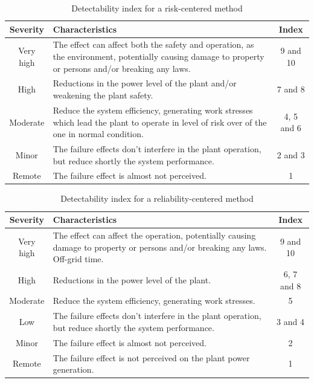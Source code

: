\begin{table}[!htb]
    \centering
        \begin{tabular}{ cp{10cm}c }
        \hline
        Severity & Characteristics & Index \\ \hline\hline
        Very high  & The effect can affect both the safety and operation, as the environment, potentially causing damage to property or persons and/or breaking any laws.  & 9 and 10 \\
        High       & Reductions in the power level of the plant and/or weakening the plant safety.  & 7 and 8 \\
        Moderate   & Reduce the system efficiency, generating work stresses which lead the plant to operate in level of risk over of the one in normal condition.  & 4, 5 and 6 \\
        Minor      & The failure effects don't interfere in the plant operation, but reduce shortly the system performance.  & 2 and 3 \\
        Remote     & The failure effect is almost not perceived.  & 1 \\
                                     
        \end{tabular}
        \caption{Detectability index for a risk-centered method}\label{tab:severity_risk}
\end{table}

\begin{table}[!htb]
    \centering
        \begin{tabular}{ cp{10cm}c }
        \hline
        Severity & Characteristics & Index \\ \hline\hline
        Very high  & The effect can affect the operation, potentially causing damage to property or persons and/or breaking any laws. Off-grid time.  & 9 and 10 \\
        High       & Reductions in the power level of the plant.  & 6, 7 and 8 \\
        Moderate   & Reduce the system efficiency, generating work stresses.  & 5 \\
        Low        & The failure effects don't interfere in the plant operation, but reduce shortly the system performance.  & 3 and 4 \\
        Minor      & The failure effect is almost not perceived.  & 2 \\
        Remote     & The failure effect is not perceived on the plant power generation.  & 1 \\
                                     
        \end{tabular}
        \caption{Detectability index for a reliability-centered method}\label{tab:severity_reliability}
\end{table}

